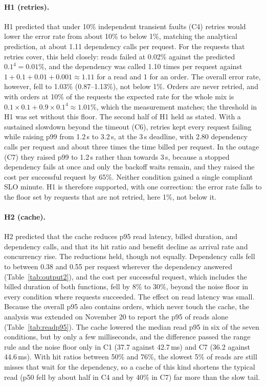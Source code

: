 \documentclass[10pt]{article}
\begin{document}
\paragraph{H1 (retries).} H1 predicted that under 10\% independent transient
faults (C4) retries would lower the error rate from about 10\% to below 1\%,
matching the analytical prediction, at about 1.11 dependency calls per request.
For the requests that retries cover, this held closely: reads failed at
0.02\% against the predicted $0.1^4 = 0.01\%$, and the dependency was called
1.10 times per request against $1 + 0.1 + 0.01 + 0.001 \approx 1.11$ for a read
and 1 for an order. The overall error rate, however, fell to 1.03\%
(0.87--1.13\%), not below 1\%. Orders are never retried, and with orders at
10\% of the requests the expected rate for the whole mix is
$0.1 \times 0.1 + 0.9 \times 0.1^4 \approx 1.01\%$, which the measurement
matches; the threshold in H1 was set without this floor. The second half of H1
held as stated. With a sustained slowdown beyond the timeout (C6), retries kept
every request failing while raising p99 from 1.2\,s to 3.2\,s, at the 3\,s
deadline, with 2.80 dependency calls per request and about three times the
time billed per request. In the outage (C7) they raised p99 to 1.2\,s rather
than towards 3\,s, because a stopped dependency fails at once and only the
backoff waits remain, and they raised the cost per successful request by 65\%.
Neither condition gained a single compliant SLO minute. H1 is therefore
supported, with one correction: the error rate falls to the floor set by
requests that are not retried, here 1\%, not below it.

\paragraph{H2 (cache).} H2 predicted that the cache reduces p95 read latency,
billed duration, and dependency calls, and that its hit ratio and benefit
decline as arrival rate and concurrency rise. The reductions held, though not
equally. Dependency calls fell to between 0.38 and 0.55 per request
wherever the dependency answered (Table~\ref{tab:output2}), and the cost per
successful request, which includes the billed duration of both functions, fell
by 8\% to 30\%, beyond the noise floor in every condition where requests
succeeded. The effect on read latency was small. Because the overall p95 also
contains orders, which never touch the cache, the analysis was extended on
November 20 to report the p95 of reads alone (Table~\ref{tab:readp95}). The
cache lowered the median read p95 in six of the seven conditions, but by only a
few milliseconds, and the difference passed the range rule and the noise floor
only in C1 (37.7 against 42.7\,ms) and C7 (36.2 against 44.6\,ms). With hit
ratios between 50\% and 76\%, the slowest 5\% of reads are still misses that
wait for the dependency, so a cache of this kind shortens the typical read
(p50 fell by about half in C4 and by 40\% in C7) far more than the slow tail.
\end{document}
